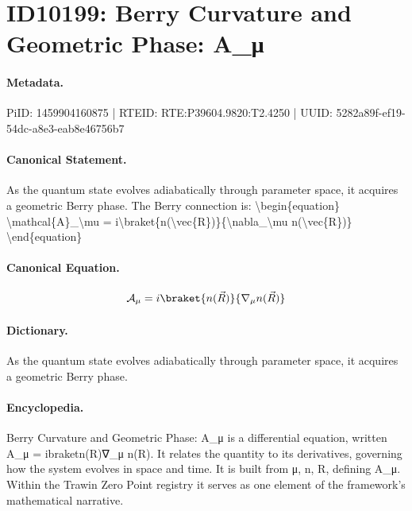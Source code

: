 \section*{ID10199: Berry Curvature and Geometric Phase: A\_μ}
\paragraph{Metadata.}
PiID: 1459904160875 | RTEID: RTE:P39604.9820:T2.4250 | UUID: 5282a89f-ef19-54dc-a8e3-eab8e46756b7

\paragraph{Canonical Statement.}
As the quantum state evolves adiabatically through parameter space, it acquires a geometric Berry phase. The Berry connection is: \textbackslash{}begin\{equation\} \textbackslash{}mathcal\{A\}\_\textbackslash{}mu = i\textbackslash{}braket\{n(\textbackslash{}vec\{R\})\}\{\textbackslash{}nabla\_\textbackslash{}mu n(\textbackslash{}vec\{R\})\} \textbackslash{}end\{equation\}

\paragraph{Canonical Equation.}
\[
\mathcal{A}_\mu = i\braket{n(\vec{R})}{\nabla_\mu n(\vec{R})}
\]

\paragraph{Dictionary.}
As the quantum state evolves adiabatically through parameter space, it acquires a geometric Berry phase.

\paragraph{Encyclopedia.}
Berry Curvature and Geometric Phase: A\_μ is a differential equation, written A\_μ = ibraketn(R)∇\_μ n(R). It relates the quantity to its derivatives, governing how the system evolves in space and time. It is built from μ, n, R, defining A\_μ. Within the Trawin Zero Point registry it serves as one element of the framework's mathematical narrative.
